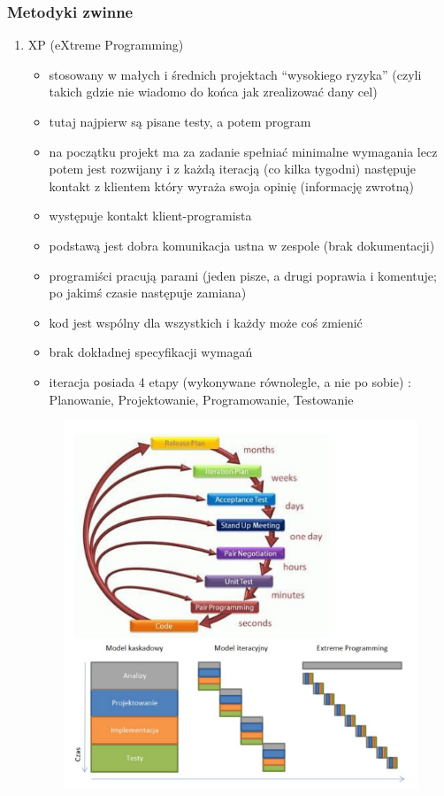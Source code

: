 \documentclass[a4paper,12pt,oneside]{book}
\begin{document}
				\subsubsection{Metodyki zwinne}
				\begin{enumerate}
					\item XP (eXtreme Programming)
					\begin{itemize}
						\item stosowany w małych i średnich projektach “wysokiego ryzyka” (czyli takich
						gdzie nie wiadomo do końca jak zrealizować dany cel)
						\item tutaj najpierw są pisane testy, a potem program
						\item na początku projekt ma za zadanie spełniać minimalne wymagania lecz
						potem jest rozwijany i z każdą iteracją (co kilka tygodni) następuje kontakt z
						klientem który wyraża swoja opinię (informację zwrotną)
						\item występuje kontakt klient-programista
						\item podstawą jest dobra komunikacja ustna w zespole (brak dokumentacji)
						\item programiści pracują parami (jeden pisze, a drugi poprawia i komentuje; po
						jakimś czasie następuje zamiana)
						\item kod jest wspólny dla wszystkich i każdy może coś zmienić
						\item brak dokładnej specyfikacji wymagań
						\item iteracja posiada 4 etapy (wykonywane równolegle, a nie po sobie) :
						Planowanie, Projektowanie, Programowanie, Testowanie					
					\end{itemize}
					\begin{figure}[h!]
						\centering\includegraphics[scale=0.8]{xp.png}
					\end{figure}
				

\end{enumerate}
\end{document}
